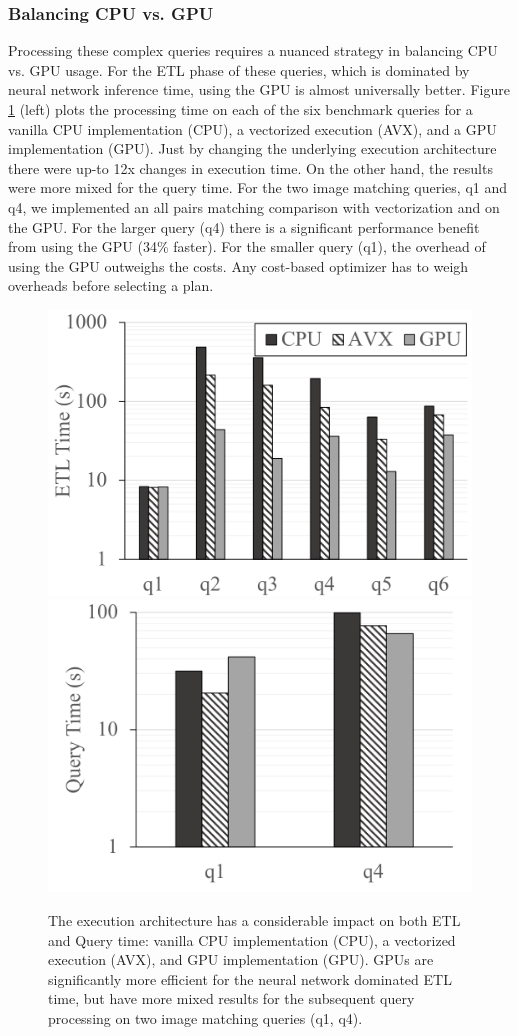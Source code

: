 \subsubsection{Balancing CPU vs. GPU}
Processing these complex queries requires a nuanced strategy in balancing CPU vs. GPU usage. 
For the ETL phase of these queries, which is dominated by neural network inference time, using the GPU is almost universally better.
Figure \ref{build} (left) plots the processing time on each of the six benchmark queries for a vanilla CPU implementation (CPU), a vectorized execution (AVX), and a GPU implementation (GPU). Just by changing the underlying execution architecture there were up-to 12x changes in execution time. 
On the other hand, the results were more mixed for the query time. 
For the two image matching queries, q1 and q4, we implemented an all pairs matching comparison with vectorization and on the GPU.
For the larger query (q4) there is a significant performance benefit from using the GPU (34\% faster).
For the smaller query (q1), the overhead of using the GPU outweighs the costs.
Any cost-based optimizer has to weigh overheads before selecting a plan.


\begin{figure}[t]
\centering
 \includegraphics[width=0.48\columnwidth]{figures/build.png}
  \includegraphics[width=0.48\columnwidth]{figures/build2.png}
 \caption{The execution architecture has a considerable impact on both ETL and Query time: vanilla CPU implementation (CPU), a vectorized execution (AVX), and GPU implementation (GPU). GPUs are significantly more efficient for the neural network dominated ETL time, but have more mixed results for the subsequent query processing on two image matching queries (q1, q4).  \label{build} }
\end{figure}

